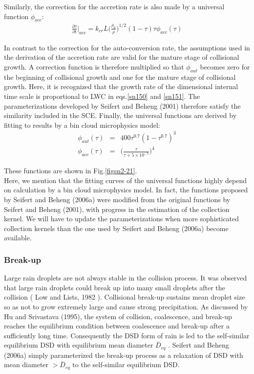 Similarly, the correction for the accretion rate is also made by a universal function $\phi_{acc}$:
\begin{eqnarray}
\frac{\partial \tau}{\partial t}\Bigr|_{acc}=k_{cr}L\bigl(\frac{\rho_{0}}{\rho}\bigr)^{1/2}(1-\tau)\tau\phi_{acc}(\tau)\label{sn151}
\end{eqnarray}

In contrast to the correction for the auto-conversion rate, the assumptions used in the derivation of the accretion rate are valid for the mature stage of collisional growth. A correction function is therefore multiplied so that $\phi_{aut}$ becomes zero for the beginning of collisional growth and one for the mature stage of collisional growth. Here, it is recognized that the growth rate of the dimensional internal time scale is proportional to LWC in eqs.\ref{sn150} and \ref{sn151}. The parameterizations developed by Seifert and Beheng (2001) therefore satisfy the similarity included in the SCE. Finally, the universal functions are derived by fitting to results by a bin cloud microphysics model:
\begin{eqnarray}
\phi_{aut}(\tau)&=&400\tau^{0.7}(1-\tau^{0.7})^{3}\label{152}\\
\phi_{acc}(\tau)&=&\bigl(\frac{\tau}{\tau+5\times 10^{-5}}\bigr)^{4}\label{153}
\end{eqnarray}

These functions are shown in Fig.\ref{figsn2-21}.\\
Here, we mention that the fitting curves of the universal functions highly depend on calculation by a bin cloud microphysics model. In fact, the functions proposed by Seifert and Beheng (2006a) were modified from the original functions by Seifert and Beheng (2001), with progress in the estimation of the collection kernel. We will have to update the parameterizations when more sophisticated collection kernels than the one used by Seifert and Beheng (2006a) become available.

\subsubsection{Break-up}
Large rain droplets are not always stable in the collision process. It was observed that large rain droplets could break up into many small droplets after the collision ( Low and Lists, 1982 ). Collisional break-up sustains mean droplet size so as not to grow extremely large and cause strong precipitation. As discussed by Hu and Srivastava (1995), the system of collision, coalescence, and break-up reaches the equilibrium condition between coalescence and break-up after a sufficiently long time. Consequently the DSD form of rain is led to the self-similar equilibrium DSD with equilibrium mean diameter $\bar{D}_{eq}$ . Seifert and Beheng (2006a) simply parameterized the break-up process as a relaxation of DSD with mean diameter $> \bar{D}_{eq}$ to the self-similar equilibrium DSD.

